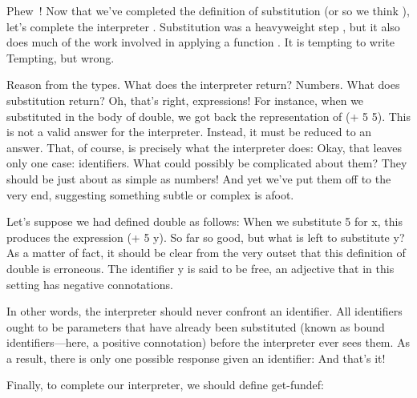 \label{interpresumed}

Phew \,! Now that we’ve completed the definition of substitution
 (or so we think
), let’s complete the interpreter .
Substitution was a heavyweight step , but it
also does much of the work 
involved in applying a function .
It is tempting to write
Tempting, but wrong.


Reason from the types. What does the interpreter return? Numbers. What does
substitution return? Oh, that’s right, expressions! For instance, when we
substituted in the body of double, we got back the representation of (+ 5 5).
This is not a valid answer for the interpreter. Instead, it must be reduced to
an answer. That, of course, is precisely what the interpreter does:
Okay, that leaves only one case: identifiers. What could possibly be complicated
about them? They should be just about as simple as numbers! And yet we’ve put
them off to the very end, suggesting something subtle or complex is afoot.


Let’s suppose we had defined double as follows:
When we substitute 5 for x, this produces the expression (+ 5 y). So far so
good, but what is left to substitute y? As a matter of fact, it should be clear
from the very outset that this definition of double is erroneous. The identifier
y is said to be free, an adjective that in this setting has negative
connotations.

In other words, the interpreter should never confront an identifier. All
identifiers ought to be parameters that have already been substituted (known as
bound identifiers—here, a positive connotation) before the interpreter ever sees
them. As a result, there is only one possible response given an identifier:
And that’s it!

Finally, to complete our interpreter, we should define get-fundef:
